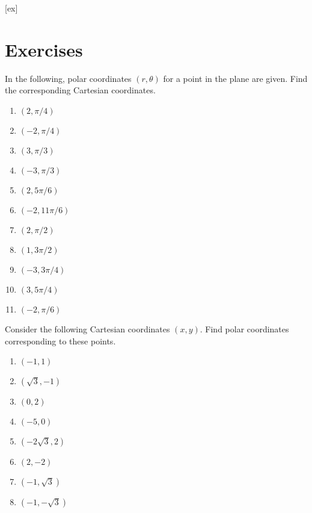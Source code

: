 [ex]
\section*{Exercises}


\begin{ex} In the following, polar coordinates $(r,\theta) $ for a
point in the plane are given. Find the corresponding Cartesian coordinates. 

\begin{enumerate}
\item $(2,\pi /4) $

\item $(-2,\pi /4) $

\item $(3,\pi /3) $

\item $(-3,\pi /3) $

\item $(2,5\pi /6) $

\item $(-2,11\pi /6) $

\item $(2,\pi /2) $

\item $(1,3\pi /2) $

\item $(-3,3\pi /4) $

\item $(3,5\pi /4) $

\item $(-2,\pi /6) $
\end{enumerate}
\end{ex}

\begin{ex} Consider the following Cartesian coordinates $(x,y)$. Find polar coordinates corresponding to these points. 

\begin{enumerate}
\item $(-1,1) $

\item $(\sqrt{3},-1) $

\item $(0,2) $

\item $(-5,0) $

\item $(-2\sqrt{3},2) $

\item $(2,-2) $

\item $(-1,\sqrt{3}) $

\item $(-1,-\sqrt{3}) $
\end{enumerate}
\end{ex}


